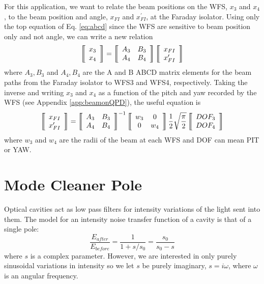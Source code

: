 For this application, we want to relate the beam positions on the WFS,
$x_{3}$ and $x_{4}$, to the beam position and angle, $x_{FI}$ and
$x^{\prime}_{FI}$, at the Faraday isolator. Using only the top
equation of Eq. \ref{eq:abcd} since the WFS are sensitive to beam
position only and not angle, we can write a new relation
\begin{equation}
\left \llbracket \begin{array}{c} 
x_3 \\
x_4 \end{array} \right\rrbracket =
\left\llbracket \begin{array}{c c}
A_3 & B_3 \\
A_4 & B_4 \end{array} \right\rrbracket
\left \llbracket \begin{array}{c} 
x_{FI} \\
x^{\prime}_{FI} \end{array} \right\rrbracket
\end{equation}
where ${A_3, B_3}$ and ${A_4, B_4}$ are the A and B ABCD matrix
elements for the beam paths from the Faraday isolator to WFS3 and
WFS4, respectively. Taking the inverse and writing $x_3$ and $x_4$ as
a function of the pitch and yaw recorded by the WFS (see Appendix
\ref{app:beamonQPD}), the useful equation is
\begin{equation}
\left \llbracket \begin{array}{c} 
x_{FI} \\
x^{\prime}_{FI} \end{array} \right\rrbracket =
\left\llbracket \begin{array}{c c}
A_3 & B_3 \\
A_4 & B_4 \end{array} \right\rrbracket^{-1}
\left\llbracket \begin{array}{c c}
w_3 & 0 \\
0 & w_4 \end{array} \right\rrbracket
\frac{1}{2} \sqrt{\frac{\pi}{2}} 
\left \llbracket \begin{array}{c} 
DOF_3 \\
DOF_4 \end{array} \right\rrbracket
\end{equation}
where $w_3$ and $w_4$ are the radii of the beam at each WFS and
DOF can mean PIT or YAW.




\section{Mode Cleaner Pole}
\label{sec:MCpole}
Optical cavities act as low pass filters for intensity variations of
the light sent into them. The model for an intensity noise transfer
function of a cavity is that of a single pole:
\begin{equation}
\frac{E_{after}}{E_{before}} = \frac{1}{1 + s/s_0} = \frac{s_0}{s_0 - s}
\end{equation}
where $s$ is a complex parameter. However, we are interested in only
purely sinusoidal variations in intensity so we let $s$ be purely
imaginary, $s=i\omega$, where $\omega$ is an angular frequency.

